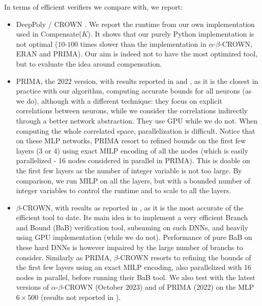 \documentclass{llncs}
\begin{document}
In terms of efficient verifiers we compare with, we report:
\begin{itemize}
	\item DeepPoly \cite{deeppoly}/ CROWN \cite{crown}. We report the runtime from our own implementation used in Compensate($K$). It shows that our purely Python implementation is not optimal ($10$-$100$ times slower than the implementation in $\alpha$-$\beta$-CROWN, ERAN and PRIMA). Our aim is indeed not to have the most optimized tool, but to evaluate the idea around compensation.
	\item PRIMA, the 2022 version, with results reported in \cite{prima} and \cite{crown}, as it is the closest in practice with our algorithm, computing accurate bounds for all neurons (as we do), although with a different technique: they focus on explicit correlations between neurons, while we consider the correlations indirectly through a better network abstraction. They use GPU while we do not. When computing the whole correlated space, 
	parallelization is difficult.
	Notice that on these MLP networks, PRIMA resort to refined bounds on the first few layers (3 or 4) using exact MILP encoding of all the nodes (which is easily parallelized - 16 nodes considered in parallel in PRIMA). This is doable on the first few layers as the number of integer variable is not too large. By comparison, we run MILP on all the layers, but with a bounded number of integer variables to control the runtime and to scale to all the layers.
	\item $\beta$-CROWN, with results as reported in \cite{crown}, as it is the most accurate of the efficient tool to date. Its main idea is to implement a very efficient Branch and Bound (BaB) verification tool, subsuming \cite{BaB} on such DNNs, and heavily using GPU implementation (while we do not). Performance of pure BaB on these hard DNNs is however impaired by the large number of branchs to consider. Similarly as PRIMA, $\beta$-CROWN resorts to refining the bounds of the first few layers using an exact MILP encoding, also parallelized with 16 nodes in parallel, before running their BaB tool. We also test with the latest versions of $\alpha$-$\beta$-CROWN (October 2023)
	and of PRIMA (2022) on the MLP $6 \times 500$ (results not reported in \cite{crown,prima}).




\end{itemize}
\end{document}
